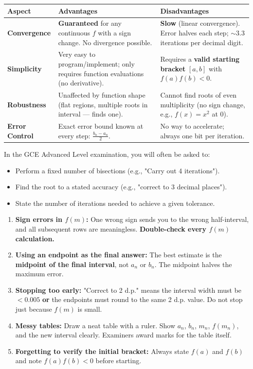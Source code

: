 \documentclass[11pt]{article}
\newcounter{popsec}
\newcounter{popsub}
\newcommand{\courssub}[1]{%
  \stepcounter{popsub}%
  \par\vspace{9pt}\noindent{\popxbold\fontsize{11.5}{13}\selectfont\color{popink}{\color{poporange}\thepopsec.\thepopsub}\hspace{6pt}#1}\par\nopagebreak\vspace{4pt}
}
\begin{document}
\begin{center}
\begin{tabularx}{\linewidth}{|l|X|X|}
\hline
\rowcolor{popblueL}
\textbf{Aspect} & \textbf{Advantages} & \textbf{Disadvantages} \\ \hline
\textbf{Convergence} & \textbf{Guaranteed} for any continuous $f$ with a sign change. No divergence possible. & \textbf{Slow} (linear convergence). Error halves each step; $\sim 3.3$ iterations per decimal digit. \\ \hline
\textbf{Simplicity} & Very easy to program/implement; only requires function evaluations (no derivative). & Requires a \textbf{valid starting bracket} $[a,b]$ with $f(a)f(b)<0$. \\ \hline
\textbf{Robustness} & Unaffected by function shape (flat regions, multiple roots in interval — finds one). & Cannot find roots of even multiplicity (no sign change, e.g., $f(x)=x^2$ at $0$). \\ \hline
\textbf{Error Control} & Exact error bound known at every step: $\frac{b_n-a_n}{2}$. & No way to accelerate; always one bit per iteration. \\ \hline
\end{tabularx}
\end{center}

\courssub{GCE Examination Technique}

In the GCE Advanced Level examination, you will often be asked to:
\begin{itemize}
    \item Perform a fixed number of bisections (e.g., "Carry out 4 iterations").
    \item Find the root to a stated accuracy (e.g., "correct to 3 decimal places").
    \item State the number of iterations needed to achieve a given tolerance.
\end{itemize}

\begin{attention}
\begin{enumerate}
    \item \textbf{Sign errors in $f(m)$:} One wrong sign sends you to the wrong half-interval, and all subsequent rows are meaningless. \textbf{Double-check every $f(m)$ calculation.}
    \item \textbf{Using an endpoint as the final answer:} The best estimate is the \textbf{midpoint of the final interval}, not $a_n$ or $b_n$. The midpoint halves the maximum error.
    \item \textbf{Stopping too early:} "Correct to 2 d.p." means the interval width must be $<0.005$ \textbf{or} the endpoints must round to the same 2 d.p. value. Do not stop just because $f(m)$ is small.
    \item \textbf{Messy tables:} Draw a neat table with a ruler. Show $a_n$, $b_n$, $m_n$, $f(m_n)$, and the new interval clearly. Examiners award marks for the table itself.
    \item \textbf{Forgetting to verify the initial bracket:} Always state $f(a)$ and $f(b)$ and note $f(a)f(b)<0$ before starting.
\end{enumerate}
\end{attention}
\end{document}
